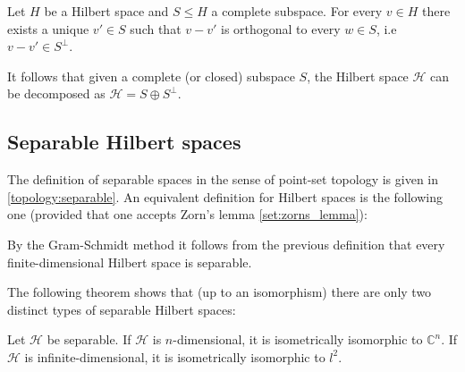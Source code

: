     \begin{theorem}
        \label{functional:projection_theorem}
        Let $H$ be a Hilbert space and $S\leq H$ a complete subspace. For every $v\in H$ there exists a unique $v'\in S$ such that $v-v'$ is orthogonal to every $w\in S$, i.e $v-v'\in S^\perp$.
    \end{theorem}
    \begin{result}
        It follows that given a complete (or closed) subspace $S$, the Hilbert space $\mathcal{H}$ can be decomposed as $\mathcal{H} = S\oplus S^\perp$.
    \end{result}


\subsection{Separable Hilbert spaces}

    The definition of separable spaces in the sense of point-set topology is given in \ref{topology:separable}. An equivalent definition for Hilbert spaces is the following one (provided that one accepts Zorn's lemma \ref{set:zorns_lemma}):
    \begin{result}
        By the Gram-Schmidt method it follows from the previous definition that every finite-dimensional Hilbert space is separable.
    \end{result}

    The following theorem shows that (up to an isomorphism) there are only two distinct types of separable Hilbert spaces:
    \begin{theorem}
        Let $\mathcal{H}$ be separable. If $\mathcal{H}$ is $n$-dimensional, it is isometrically isomorphic to $\mathbb{C}^n$. If $\mathcal{H}$ is infinite-dimensional, it is isometrically isomorphic to $l^2$.
    \end{theorem}

